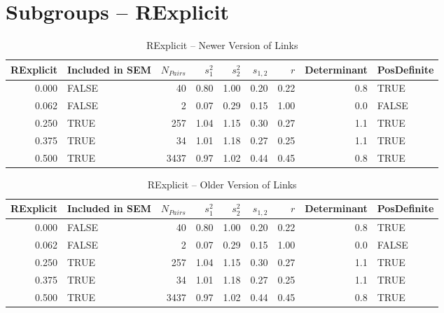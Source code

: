 \documentclass{article}\usepackage{graphicx, color}
\begin{document}
\section{Subgroups --  RExplicit }%
\begin{table}[ht]
\centering
\begin{tabular}{rlrrrrrrl}
  \hline
RExplicit & Included in SEM & $N_{Pairs}$ & $s_1^2$ & $s_2^2$ & $s_{1,2}$ & $r$ & Determinant & PosDefinite \\ 
  \hline
0.000 & FALSE & 40 & 0.80 & 1.00 & 0.20 & 0.22 & 0.8 & TRUE \\ 
  0.062 & FALSE & 2 & 0.07 & 0.29 & 0.15 & 1.00 & 0.0 & FALSE \\ 
  0.250 & TRUE & 257 & 1.04 & 1.15 & 0.30 & 0.27 & 1.1 & TRUE \\ 
  0.375 & TRUE & 34 & 1.01 & 1.18 & 0.27 & 0.25 & 1.1 & TRUE \\ 
  0.500 & TRUE & 3437 & 0.97 & 1.02 & 0.44 & 0.45 & 0.8 & TRUE \\ 
   \hline
\end{tabular}
\caption{RExplicit -- Newer Version of Links} 
\end{table}
\begin{table}[ht]
\centering
\begin{tabular}{rlrrrrrrl}
  \hline
RExplicit & Included in SEM & $N_{Pairs}$ & $s_1^2$ & $s_2^2$ & $s_{1,2}$ & $r$ & Determinant & PosDefinite \\ 
  \hline
0.000 & FALSE & 40 & 0.80 & 1.00 & 0.20 & 0.22 & 0.8 & TRUE \\ 
  0.062 & FALSE & 2 & 0.07 & 0.29 & 0.15 & 1.00 & 0.0 & FALSE \\ 
  0.250 & TRUE & 257 & 1.04 & 1.15 & 0.30 & 0.27 & 1.1 & TRUE \\ 
  0.375 & TRUE & 34 & 1.01 & 1.18 & 0.27 & 0.25 & 1.1 & TRUE \\ 
  0.500 & TRUE & 3437 & 0.97 & 1.02 & 0.44 & 0.45 & 0.8 & TRUE \\ 
   \hline
\end{tabular}
\caption{RExplicit -- Older Version of Links} 
\end{table}
\newpage 
\end{document}
